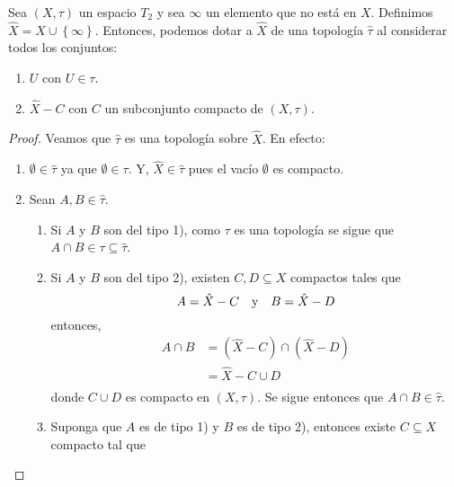 \documentclass[12pt]{report}
\theoremstyle{largebreak}
\begin{document}
    \begin{propo}
        Sea $(X,\tau)$ un espacio $T_2$ y sea $\infty$ un elemento que no está en $X$. Definimos $\hat{X}=X\cup\left\{\infty \right\}$. Entonces, podemos dotar a $\hat{X}$ de una topología $\hat{\tau}$ al considerar todos los conjuntos:
        \begin{enumerate}
            \item $U$ con $U\in\tau$.
            \item $\hat{X}-C$ con $C$ un subconjunto compacto de $(X,\tau)$.
        \end{enumerate}
    \end{propo}

    \begin{proof}
        Veamos que $\hat{\tau}$ es una topología sobre $\hat{X}$. En efecto:
        \begin{enumerate}
            \item $\emptyset\in\hat{\tau}$ ya que $\emptyset\in\tau$. Y, $\hat{X}\in\hat{\tau}$ pues el vacío $\emptyset$ es compacto.
            \item Sean $A,B\in\hat{\tau}$.
            \begin{enumerate}
                \item Si $A$ y $B$ son del tipo 1), como $\tau$ es una topología se sigue que $A\cap B\in\tau\subseteq\hat{\tau}$.
                \item Si $A$ y $B$ son del tipo 2), existen $C,D\subseteq X$ compactos tales que
                \begin{equation*}
                    A=\hat{X}-C\quad\textup{y}\quad B=\hat{X}-D
                \end{equation*}
                entonces,
                \begin{equation*}
                    \begin{split}
                        A\cap B&=(\hat{X}-C)\cap(\hat{X}-D)\\
                        &=\hat{X}-C\cup D\\
                    \end{split}
                \end{equation*}
                donde $C\cup D$ es compacto en $(X,\tau)$. Se sigue entonces que $A\cap B\in\hat{\tau}$.
                \item Suponga que $A$ es de tipo 1) y $B$ es de tipo 2), entonces existe $C\subseteq X$ compacto tal que
                \begin{equation*}

\end{equation*}
\end{enumerate}
\end{enumerate}
\end{proof}
\end{document}
